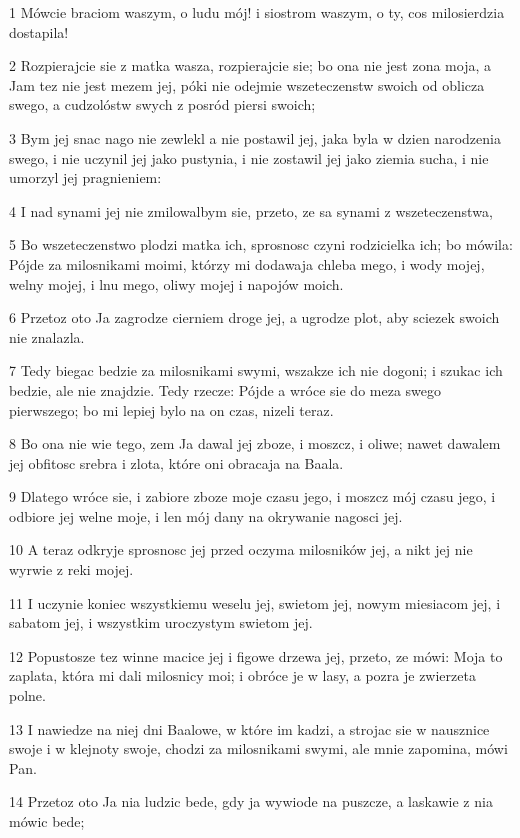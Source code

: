 \par 1 Mówcie braciom waszym, o ludu mój! i siostrom waszym, o ty, cos milosierdzia dostapila!
\par 2 Rozpierajcie sie z matka wasza, rozpierajcie sie; bo ona nie jest zona moja, a Jam tez nie jest mezem jej, póki nie odejmie wszeteczenstw swoich od oblicza swego, a cudzolóstw swych z posród piersi swoich;
\par 3 Bym jej snac nago nie zewlekl a nie postawil jej, jaka byla w dzien narodzenia swego, i nie uczynil jej jako pustynia, i nie zostawil jej jako ziemia sucha, i nie umorzyl jej pragnieniem:
\par 4 I nad synami jej nie zmilowalbym sie, przeto, ze sa synami z wszeteczenstwa,
\par 5 Bo wszeteczenstwo plodzi matka ich, sprosnosc czyni rodzicielka ich; bo mówila: Pójde za milosnikami moimi, którzy mi dodawaja chleba mego, i wody mojej, welny mojej, i lnu mego, oliwy mojej i napojów moich.
\par 6 Przetoz oto Ja zagrodze cierniem droge jej, a ugrodze plot, aby sciezek swoich nie znalazla.
\par 7 Tedy biegac bedzie za milosnikami swymi, wszakze ich nie dogoni; i szukac ich bedzie, ale nie znajdzie. Tedy rzecze: Pójde a wróce sie do meza swego pierwszego; bo mi lepiej bylo na on czas, nizeli teraz.
\par 8 Bo ona nie wie tego, zem Ja dawal jej zboze, i moszcz, i oliwe; nawet dawalem jej obfitosc srebra i zlota, które oni obracaja na Baala.
\par 9 Dlatego wróce sie, i zabiore zboze moje czasu jego, i moszcz mój czasu jego, i odbiore jej welne moje, i len mój dany na okrywanie nagosci jej.
\par 10 A teraz odkryje sprosnosc jej przed oczyma milosników jej, a nikt jej nie wyrwie z reki mojej.
\par 11 I uczynie koniec wszystkiemu weselu jej, swietom jej, nowym miesiacom jej, i sabatom jej, i wszystkim uroczystym swietom jej.
\par 12 Popustosze tez winne macice jej i figowe drzewa jej, przeto, ze mówi: Moja to zaplata, która mi dali milosnicy moi; i obróce je w lasy, a pozra je zwierzeta polne.
\par 13 I nawiedze na niej dni Baalowe, w które im kadzi, a strojac sie w nausznice swoje i w klejnoty swoje, chodzi za milosnikami swymi, ale mnie zapomina, mówi Pan.
\par 14 Przetoz oto Ja nia ludzic bede, gdy ja wywiode na puszcze, a laskawie z nia mówic bede;
